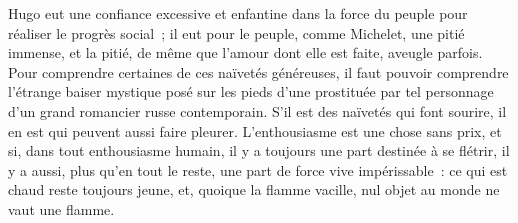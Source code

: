 \documentclass[french,twoside]{book} %
\begin{document}
\noindent Hugo eut une confiance excessive et enfantine dans la force du peuple pour réaliser le progrès social ; il eut pour le peuple, comme Michelet, une pitié immense, et la pitié, de même que l’amour dont elle est faite, aveugle parfois. Pour comprendre certaines de ces naïvetés généreuses, il faut pouvoir comprendre l’étrange baiser mystique posé sur les pieds d’une prostituée par tel personnage d’un grand romancier russe contemporain. S’il est des naïvetés qui font sourire, il en est qui peuvent aussi faire pleurer. L’enthousiasme est une chose sans prix, et si, dans tout enthousiasme humain, il y a toujours une part destinée à se flétrir, il y a aussi, plus qu’en tout le reste, une part de force vive impérissable : ce qui est chaud reste toujours jeune, et, quoique la flamme vacille, nul objet au monde ne vaut une flamme.\par
\end{document}
